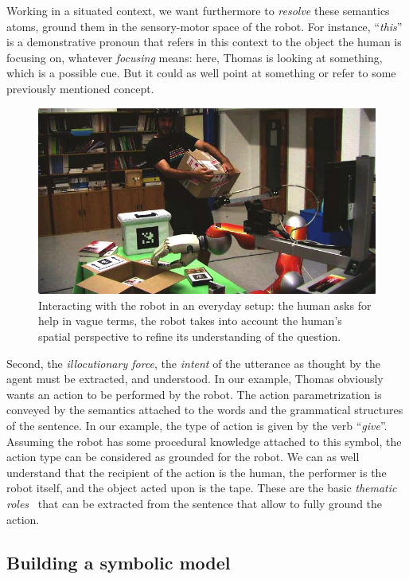 Working in a situated context, we want furthermore to \emph{resolve} these
semantics atoms, \ie ground them in the sensory-motor space of the robot. For
instance, ``\textit{this}'' is a demonstrative pronoun that refers in this
context to the object the human is focusing on, whatever \textit{focusing}
means: here, Thomas is looking at something, which is a possible cue. But it
could as well point at something or refer to some previously mentioned concept. 

\begin{figure}%
	\centering
	\includegraphics[width=0.9\linewidth]{images/dialogs/pt.jpg} 
	\caption{Interacting with
	the robot in an everyday setup: the human asks for help in vague terms, the
	robot takes into account the human's spatial perspective to refine its
	understanding of the question.} 
	\label{fig|vpt} 
\end{figure}


Second, the \emph{illocutionary force}, \ie the \emph{intent} of the utterance
as thought by the agent must be extracted, and understood. In our example,
Thomas obviously wants an action to be performed by the robot. The action
parametrization is conveyed by the semantics attached to the words and the
grammatical structures of the sentence. In our example, the type of action is
given by the verb ``\textit{give}''. Assuming the robot has some procedural
knowledge attached to this symbol, the action type can be considered as
grounded for the robot. We can as well understand that the recipient of the
action is the human, the performer is the robot itself, and the object acted
upon is the tape. These are the basic \emph{thematic roles}~\cite{Gruber1965}
that can be extracted from the sentence that allow to fully ground the action.

\subsection{Building a symbolic model}

